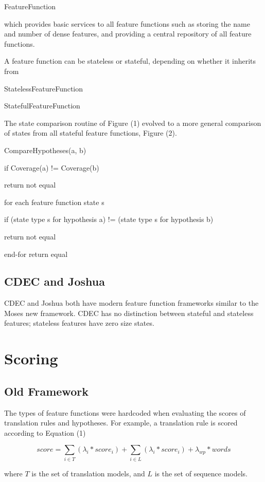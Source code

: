 \documentclass{pbml}
\begin{document}
    FeatureFunction

which provides basic services to all feature functions such as storing the name and number of dense features, and providing a central repository of all feature functions.

A feature function can be stateless or stateful, depending on whether it inherits from

StatelessFeatureFunction

StatefulFeatureFunction

The state comparison routine of Figure (1) evolved to a more general comparison of states from all stateful feature functions, Figure (2).

    CompareHypotheses(a, b)

       if Coverage(a) != Coverage(b)

         return not equal

        for each feature function state s

          if (state type s for hypothesis a) != (state type s for hypothesis b)

             return not equal

        end-for
        return equal
        
\subsection{CDEC and Joshua}
CDEC and Joshua both have modern feature function frameworks similar to the Moses new framework. CDEC has no distinction between stateful and stateless features; stateless features have zero size states.

\section{Scoring}
\subsection{Old Framework}
The types of feature functions were hardcoded when evaluating the scores of translation rules and hypotheses. For example, a translation rule is scored according to Equation (1)

\begin{equation}
  score = \sum_{i \in T}(\lambda_i * score_i) + \sum_{i  \in L} (\lambda_i * score_i) + \lambda_{wp} * words
\end{equation}

where $T$ is the set of translation models, and $L$ is the set of sequence models.
\end{document}

